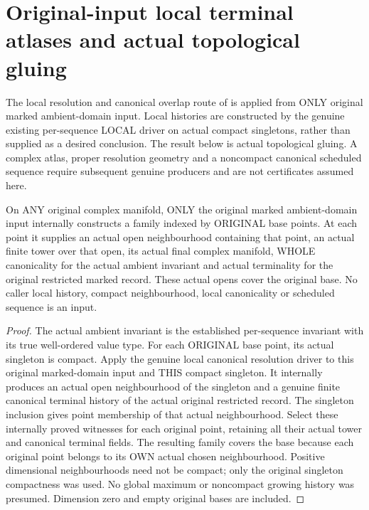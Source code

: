 \section{Original-input local terminal atlases and actual topological gluing}

The local resolution and canonical overlap route of
\cite{wlodarczyk05-hironaka,bierstone-milman08-functoriality} is applied
from ONLY original marked ambient-domain input. Local histories are
constructed by the genuine existing per-sequence LOCAL driver on actual
compact singletons, rather than supplied as a desired conclusion.
The result below is actual topological gluing. A complex atlas, proper
resolution geometry and a noncompact canonical scheduled sequence require
subsequent genuine producers and are not certificates assumed here.

\begin{theorem}
\label{hir:original-input-covering-local-canonical-terminal-atlas}
\leanok
On ANY original complex manifold, ONLY the original marked ambient-domain
input internally constructs a family indexed by ORIGINAL base points.
At each point it supplies an actual open neighbourhood containing that
point, an actual finite tower over that open, its actual final complex
manifold, WHOLE canonicality for the actual ambient invariant and actual
terminality for the original restricted marked record. These actual opens
cover the original base. No caller local history, compact neighbourhood,
local canonicality or scheduled sequence is an input.
\end{theorem}
\begin{proof}
The actual ambient invariant is the established per-sequence invariant
with its true well-ordered value type. For each ORIGINAL base point,
its actual singleton is compact. Apply the genuine local canonical
resolution driver to this original marked-domain input and THIS compact
singleton. It internally produces an actual open neighbourhood of the
singleton and a genuine finite canonical terminal history of the actual
original restricted record. The singleton inclusion gives point membership
of that actual neighbourhood. Select these internally proved witnesses
for each original point, retaining all their actual tower and canonical
terminal fields. The resulting family covers the base because each
original point belongs to its OWN actual chosen neighbourhood. Positive
dimensional neighbourhoods need not be compact; only the original
singleton compactness was used. No global maximum or noncompact growing
history was presumed. Dimension zero and empty original bases are included.
\end{proof}


